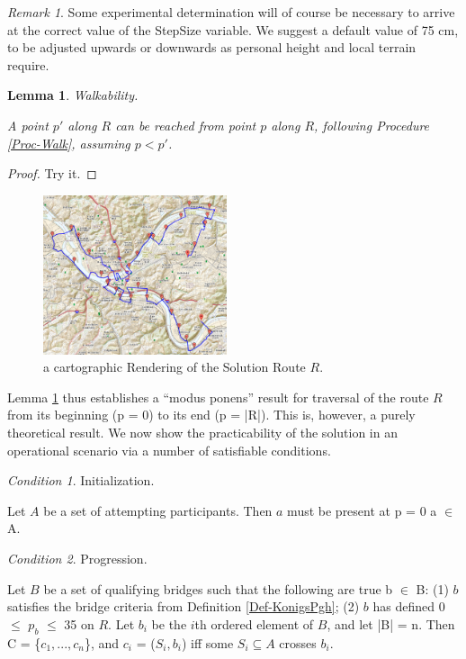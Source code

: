 \documentclass[twocolumn]{article}
\renewcommand\forall{\raisebox{\depth}{\rotatebox{180}{A}}}
\theoremstyle{plain}  %
\newtheorem{lemma}{Lemma}
\theoremstyle{definition}  %
\theoremstyle{remark}  %
\newtheorem{rem}{Remark}
\newtheorem{cond}{Condition}
\begin{document}
\begin{rem}
Some experimental determination will of course be necessary to arrive at the correct value of the StepSize variable.  We suggest a default value of 75 cm, to be adjusted upwards or downwards as personal height and local terrain require.
\end{rem}

\begin{lemma} \label{Lemma-Walk}
Walkability.

A point $p'$ along $R$ can be reached from point $p$ along $R$, following Procedure \ref{Proc-Walk}, assuming $p < p'$.

\end{lemma}
\begin{proof}
	Try it.
\end{proof}

\begin{figure}[t]
	\centering
	\includegraphics[width=0.48\textwidth]{solution.png}
	\caption{a cartographic Rendering of the Solution Route $R$.}
	\label{fig:solution}
\end{figure}

Lemma \ref{Lemma-Walk} thus establishes a ``modus ponens'' result for traversal of the route $R$ from its beginning (p = 0) to its end (p = |R|).  This is, however, a purely theoretical result.  We now show the practicability of the solution in an operational scenario via a number of satisfiable conditions.

\begin{cond}
	\label{cond:init}
Initialization.

Let $A$ be a set of attempting participants.  Then $a$ must be present at p = 0 \forall{}a $\in$ A.
\end{cond}

\begin{cond}
	\label{cond:prog}
Progression.

Let $B$ be a set of qualifying bridges such that the following are true \forall{}b $\in$ B:  (1) $b$ satisfies the bridge criteria from Definition \ref{Def-KonigsPgh}; (2) $b$ has defined 0 $\leq$ $p_b$ $\leq$ 35 on $R$.  Let $b_i$ be the $i$th ordered element of $B$, and let |B| = n.  Then C = \{$c_1, ..., c_n$\}, and $c_i$ = ($S_i, b_i$) iff some $S_i \subseteq A$ crosses $b_i$.
\end{cond}
\end{document}
